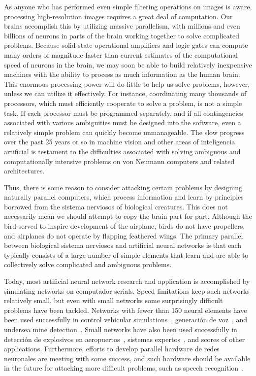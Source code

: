 \documentclass[10pt,twocolumn]{article}
\begin{document}
As anyone who has performed even simple filtering operations on images is aware,
processing high-resolution images requires a great deal of computation. Our
brains accomplish this by utilizing massive parallelism, with millions and even
billions of neurons in parts of the brain working together to solve complicated
problems. Because solid-state operational amplifiers and logic gates can compute
many orders of magnitude faster than current estimates of the computational
speed of neurons in the brain, we may soon be able to build relatively
inexpensive machines with the ability to process as much information as the
human brain. This enormous processing power will do little to help us solve
problems, however, unless we can utilize it effectively. For instance,
coordinating many thousands of processors, which must efficiently cooperate to
solve a problem, is not a simple task. If each processor must be programmed
separately, and if all contingencies associated with various ambiguities must be
designed into the software, even a relatively simple problem can quickly become
unmanageable. The slow progress over the past 25 years or so in machine vision
and other areas of inteligencia artificial is testament to the difficulties
associated with solving ambiguous and computationally intensive problems on von
Neumann computers and related architectures.

Thus, there is some reason to consider attacking certain problems by designing
naturally parallel computers, which process information and learn by principles
borrowed from the sistema nerviosos of biological creatures. This does not
necessarily mean we should attempt to copy the brain part for part. Although the
bird served to inspire development of the airplane, birds do not have
propellers, and airplanes do not operate by flapping feathered wings. The
primary parallel between biological sistema nerviosos and artificial neural
networks is that each typically consists of a large number of simple elements
that learn and are able to collectively solve complicated and ambiguous
problems.

Today, most artificial neural network research and application is accomplished
by simulating networks on computador serials. Speed limitations keep such networks
relatively small, but even with small networks some surprisingly difficult
problems have been tackled. Networks with fewer than 150 neural elements have
been used successfully in control vehicular simulations~\cite{nguyen90},
generación de voz~\cite{nettalk,nettalk2}, and undersea mine
detection~\cite{darpa}. Small networks have also been used successfully in
detección de explosivos en aeropuertos~\cite{shea}, sistemas expertos~\cite{bounds,bradshaw},
and scores of other applications. Furthermore, efforts to develop parallel
hardware de redes neuronales are meeting with some success, and such hardware should
be available in the future for attacking more difficult problems, such as speech
recognition~\cite{mokhoff,mead}.
\end{document}
